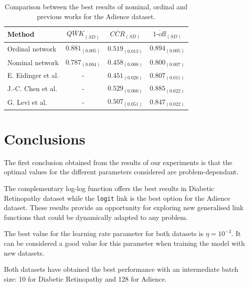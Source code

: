 \documentclass[journal]{IEEEtran}
\begin{document}
	\begin{table}[!t]
		\caption{Comparison between the best results of nominal, ordinal and previous works for the Adience dataset.}
		\label{table:ComparisonAdience}
		\scriptsize
		\centering
		\def\arraystretch{1.3}
		\begin{tabular}{lccc}
			\hline
			\hline
			Method                                    & $\overline{QWK}_{(SD)}$ & $\overline{CCR}_{(SD)}$ & $\overline{\text{1-off}}_{(SD)}$ \\ \hline
			Ordinal network                           &    $0.881_{(0.005)}$    &    $0.519_{(0.013)}$    &        $0.894_{(0.005)}$         \\
			Nominal network                           &    $0.787_{(0.004)}$    &    $0.458_{(0.008)}$    &        $0.800_{(0.007)}$         \\
			E. Eidinger et al. \cite{eidinger2014age} &            -            &    $0.451_{(0.026)}$    &        $0.807_{(0.011)}$         \\
			J.-C. Chen et al. \cite{chen2016cascaded} &            -            &    $0.529_{(0.060)}$    &        $0.885_{(0.022)}$         \\
			G. Levi et al. \cite{levi2015age}         &            -            &    $0.507_{(0.051)}$    &        $0.847_{(0.022)}$		 \\
			\hline
			\hline
		\end{tabular}
	\end{table}
	
	\section{Conclusions}
	\label{sect:conclusions}
	The first conclusion obtained from the results of our experiments is that the optimal values for the different parameters considered are problem-dependant. 
	
	The complementary log-log function offers the best results in Diabetic Retinopathy dataset while the \texttt{logit} link is the best option for the Adience dataset. These results provide an opportunity for exploring new generalised link functions that could be dynamically adapted to any problem.
	
	The best value for the learning rate parameter for both datasets is $\eta = 10^{-3}$. It can be considered a good value for this parameter when training the model with new datasets.
	
	Both datasets have obtained the best performance with an intermediate batch size: 10 for Diabetic Retinopathy and 128 for Adience.
	
\end{document}
